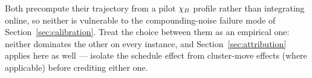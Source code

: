 Both precompute their trajectory from a pilot $\chi_B$ profile rather than
integrating online, so neither is vulnerable to the compounding-noise
failure mode of Section~\ref{sec:calibration}. Treat the choice between
them as an empirical one: neither dominates the other on every instance,
and Section~\ref{sec:attribution} applies here as well --- isolate the
schedule effect from cluster-move effects (where applicable) before
crediting either one.
